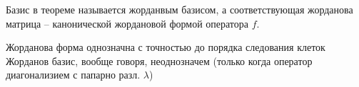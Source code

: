     \begin{definition}
        Базис в теореме называется жорданвым базисом, а соответствующая жорданова матрица -- канонической
        жордановой формой оператора $f$.
    \end{definition}
    $ $\\
    Жорданова форма однозначна с точностью до порядка следования клеток \\
    Жорданов базис, вообще говоря, неоднозначем (только когда оператор диагонализием с папарно разл. $\lambda$)

